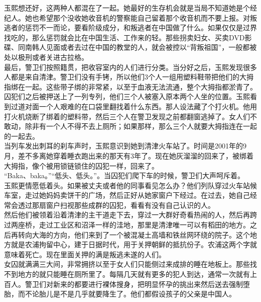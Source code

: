 \begin{multicols}{\theparacolNo}
玉熙想还好，这两种人都混在了一起。她最好的生存机会就是当局不知道她是个经纪人。她也希望那个没收她收音机的警察能自己留着那个收音机而不要上报。对叛逃者的惩罚不一而论，要看阶级成分，和叛逃者在中国做了什么。如果仅仅是过界找吃的，那么惩罚就会比在中国生活、工作来的轻。那些拐卖妇女、买卖DVD影碟、同南韩人见面或者去过在中国的教堂的人，就会被控以“背叛祖国”，一般都被处以极刑或者关进古拉格。\\

最后，警卫们按照籍贯，把收容室内的人们进行分类。当分好之后，玉熙发现很多人都是来自清津。警卫们没有手铐，所以他们3个人一组用塑料鞋带把他们的大拇指绑在一起。这些带子绑的非常紧，以至于血液无法流通，整个大拇指都淤青了。囚犯们之后被押送上了一列专列，他们三个人被塞入原本两个人坐的位置。玉熙看到过道对面一个人艰难的在口袋里翻找着什么东西。那人设法藏了个打火机。他用打火机烧断了绑着的塑料带，然后三个人在警卫发现之前都翻窗逃掉了。女人们不敢动，除非有一个人不得不去上厕所；如果那样，那么三个人就要大拇指连在一起的一起去。\\

当列车发出刺耳的刹车声时，玉熙意识到她到清津火车站了。时间是2001年的9月，差不多离她穿着睡衣跑出来的那天有3年了。现在她灰溜溜的回来了，被绑着大拇指，像个被用锁链锁住的囚犯一样，回来了。\\

“Baka、baka。”“低头、低头。”。当囚犯们爬下车的时候，警卫们大声呵斥着。\\

玉熙更情愿低着头。如果被丈夫或者他的同事看见怎么办？他们列队穿过火车站候车室，走过她妈妈卖饼干的广场，然后正好从她家窗户下经过。在过去，她自己经常会透过那扇窗户扫视那些成群的囚犯，看看有没有自己认识的人。\\

然后他们被领着沿着清津的主干道走下去，穿过一大群好奇看热闹的人，然后再跨过两座桥，走过工业区和沼泽一样的洼地，那里是清津唯一可以有稻田的地方。之后再转向大海的方向，他们来到了一个被混凝土高墙和铁丝网环绕的院子。这个地方就是农浦拘留中心，建于日据时代，用于关押朝鲜的抵抗份子。农浦这两个字就意味着死亡。现在里面关押的满是叛逃未遂的人们。\\

女囚就满满三大间，非常拥挤以至于女人们只能侧过来成排的睡在地板上。那些找不到地方的就只能睡在厕所里了。每隔几天就有更多的犯人到达，通常一次就有上百人。警卫们对新来的都要进行裸体搜身，把明显怀孕的挑出来然后送去强制堕胎，而不论胎儿是不是几乎就要降生了。他们都假设孩子的父亲是中国人。\\


\end{multicols}
